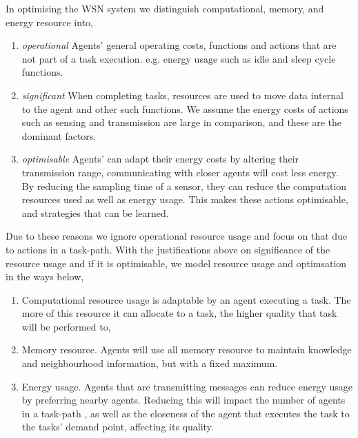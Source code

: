 In optimising the WSN system we distinguish computational, memory, and energy resource into,
\begin{enumerate}
	\item \textit{operational} Agents' general operating costs, functions and actions that are not part of a task execution. e.g. energy usage such as idle and sleep cycle functions. 
	
	\item \textit{significant} When completing tasks, resources are used to move data internal to the agent and other such functions. We assume the energy costs of actions such as sensing and transmission are large in comparison, and these are the dominant factors.
	
	\item \textit{optimisable} Agents' can adapt their energy costs by altering  their transmission range, communicating with closer agents will cost less energy. By reducing the sampling time of a sensor, they can reduce the computation resources used as well as energy usage. This makes these actions optimisable, and strategies that can be learned.
\end{enumerate} 

Due to these reasons we ignore operational resource usage and focus on that due to actions in a task-path. With the justifications above on significance of the resource usage and if it is optimisable, we model resource usage and optimsation in the ways below,
\begin{enumerate}
	\item Computational resource usage is adaptable by an agent executing a task. The more of this resource it can allocate to a task, the higher quality that task will be performed to,
	\item Memory resource. Agents will use all memory resource to maintain knowledge and neighbourhood information, but with a fixed maximum.
	\item Energy usage. Agents that are transmitting messages can reduce energy usage by preferring nearby agents. Reducing this will impact the number of agents in a task-path , as well as the closeness of the agent that executes the task to the tasks' demand point, affecting its quality.  
\end{enumerate}